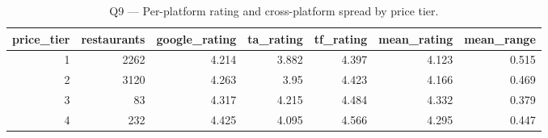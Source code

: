 \begin{table}[ht]
\centering
\caption{Q9 — Per-platform rating and cross-platform spread by price tier.}
\label{tab:q9_price_vs_rating}
{\tiny
\begin{tabular}{rrrrrrr}
\toprule
price\_tier & restaurants & google\_rating & ta\_rating & tf\_rating & mean\_rating & mean\_range \\
\midrule
1 & 2262 & 4.214 & 3.882 & 4.397 & 4.123 & 0.515 \\
2 & 3120 & 4.263 & 3.95 & 4.423 & 4.166 & 0.469 \\
3 & 83 & 4.317 & 4.215 & 4.484 & 4.332 & 0.379 \\
4 & 232 & 4.425 & 4.095 & 4.566 & 4.295 & 0.447 \\
\bottomrule
\end{tabular}
}
\end{table}
